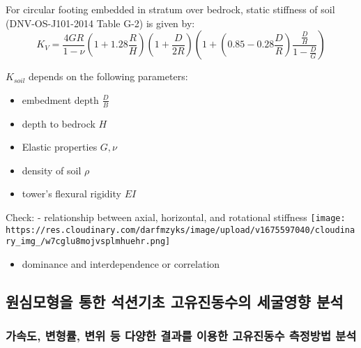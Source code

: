 \documentclass[
  letterpaper,
  DIV=11,
  numbers=noendperiod]{scrreprt}
\providecommand{\tightlist}{%
  \setlength{\itemsep}{0pt}\setlength{\parskip}{0pt}}\usepackage{longtable,booktabs,array}
\begin{document}
For circular footing embedded in stratum over bedrock, static stiffness
of soil (DNV-OS-J101-2014 Table G-2) is given by: \[
K_V = \frac{4GR}{1-\nu} (1+ 1.28 \frac{R}{H}) (1+ \frac{D}{2R}) (1+ (0.85  -0.28 \frac{D}{R})\frac{\frac{D}{H}}{1-\frac{D}{G}})
\]

\(K_{soil}\) depends on the following parameters:

\begin{itemize}
\tightlist
\item
  embedment depth \(\frac{D}{B}\)
\item
  depth to bedrock \(H\)
\item
  Elastic properties \(G, \nu\)
\item
  density of soil \(\rho\)
\item
  tower's flexural rigidity \(EI\)
\end{itemize}

Check: - relationship between axial, horizontal, and rotational
stiffness
\texttt{[image: https://res.cloudinary.com/darfmzyks/image/upload/v1675597040/cloudinary\_img\_/w7cglu8mojvsplmhuehr.png]}

\begin{itemize}
\tightlist
\item
  dominance and interdependence or correlation
\end{itemize}

\hypertarget{uxc6d0uxc2ecuxbaa8uxd615uxc744-uxd1b5uxd55c-uxc11duxc158uxae30uxcd08-uxace0uxc720uxc9c4uxb3d9uxc218uxc758-uxc138uxad74uxc601uxd5a5-uxbd84uxc11d}{%
\subsection{원심모형을 통한 석션기초 고유진동수의 세굴영향
분석}\label{uxc6d0uxc2ecuxbaa8uxd615uxc744-uxd1b5uxd55c-uxc11duxc158uxae30uxcd08-uxace0uxc720uxc9c4uxb3d9uxc218uxc758-uxc138uxad74uxc601uxd5a5-uxbd84uxc11d}}

\hypertarget{uxac00uxc18duxb3c4-uxbcc0uxd615uxb960-uxbcc0uxc704-uxb4f1-uxb2e4uxc591uxd55c-uxacb0uxacfcuxb97c-uxc774uxc6a9uxd55c-uxace0uxc720uxc9c4uxb3d9uxc218-uxce21uxc815uxbc29uxbc95-uxbd84uxc11d}{%
\subsubsection{가속도, 변형률, 변위 등 다양한 결과를 이용한 고유진동수
측정방법
분석}\label{uxac00uxc18duxb3c4-uxbcc0uxd615uxb960-uxbcc0uxc704-uxb4f1-uxb2e4uxc591uxd55c-uxacb0uxacfcuxb97c-uxc774uxc6a9uxd55c-uxace0uxc720uxc9c4uxb3d9uxc218-uxce21uxc815uxbc29uxbc95-uxbd84uxc11d}}
\end{document}

